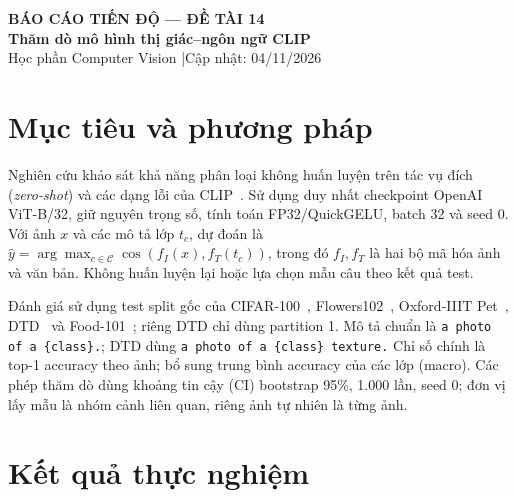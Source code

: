 \documentclass[11pt,a4paper]{article}
\begin{document}
\begin{center}
 {\large\bfseries BÁO CÁO TIẾN ĐỘ — ĐỀ TÀI 14}\\[3pt]
 {\Large\bfseries Thăm dò mô hình thị giác–ngôn ngữ CLIP}\\[4pt]
 {\small Học phần Computer Vision \quad|\quad Cập nhật: 04/11/2026}
\end{center}
\vspace{-7pt}
\begin{abstract}
\noindent Báo cáo đánh giá CLIP ViT-B/32 trên năm bộ dữ liệu và bốn phép thăm dò có kiểm soát. Kết quả cho thấy độ chính xác tổng thể che khuất nhiều lớp nhận dạng kém; nhận dạng vật thể tốt chưa bảo đảm xử lý đúng số lượng và quan hệ không gian. Một phép thử bổ sung thông tin nhóm cha vào mô tả lớp CIFAR-100 làm giảm độ chính xác 1,56 điểm phần trăm. Các kết luận được giới hạn theo checkpoint, dữ liệu và mẫu câu đã kiểm tra.
\end{abstract}
\vspace{-5pt}

\section{Mục tiêu và phương pháp}
Nghiên cứu khảo sát khả năng phân loại không huấn luyện trên tác vụ đích (\emph{zero-shot}) và các dạng lỗi của CLIP~\cite{clip}. Sử dụng duy nhất checkpoint OpenAI ViT-B/32, giữ nguyên trọng số, tính toán FP32/QuickGELU, batch 32 và seed 0. Với ảnh $x$ và các mô tả lớp $t_c$, dự đoán là
\(\hat y=\arg\max_{c\in\mathcal C}\cos(f_I(x),f_T(t_c))\),
trong đó $f_I,f_T$ là hai bộ mã hóa ảnh và văn bản. Không huấn luyện lại hoặc lựa chọn mẫu câu theo kết quả test.

Đánh giá sử dụng test split gốc của CIFAR-100~\cite{cifar}, Flowers102~\cite{flowers}, Oxford-IIIT Pet~\cite{pet}, DTD~\cite{dtd} và Food-101~\cite{food}; riêng DTD chỉ dùng partition 1. Mô tả chuẩn là \texttt{a photo of a \{class\}.}; DTD dùng \texttt{a photo of a \{class\} texture.} Chỉ số chính là top-1 accuracy theo ảnh; bổ sung trung bình accuracy của các lớp (macro). Các phép thăm dò dùng khoảng tin cậy (CI) bootstrap 95\%, 1.000 lần, seed 0; đơn vị lấy mẫu là nhóm cảnh liên quan, riêng ảnh tự nhiên là từng ảnh.

\section{Kết quả thực nghiệm}
\end{document}
